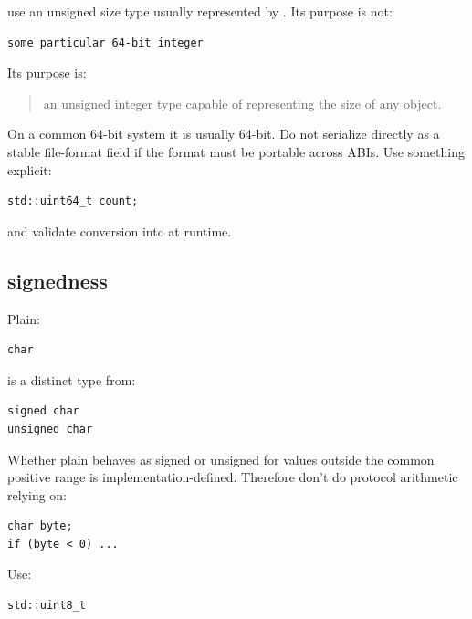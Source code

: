 use an unsigned size type usually represented by . Its purpose is not:

\begin{verbatim}
some particular 64-bit integer
\end{verbatim}

Its purpose is:

\begin{quote}
an unsigned integer type capable of representing the size of any object.
\end{quote}

On a common 64-bit system it is usually 64-bit. Do not serialize  directly as a stable file-format field if the format must be portable across ABIs. Use something explicit:

\begin{verbatim}
std::uint64_t count;
\end{verbatim}

and validate conversion into  at runtime.

\subsection{\texorpdfstring{ signedness}{char signedness}}\label{05-engine-i-ch002-char-signedness}

\hypertarget{05-engine-i-ch002-char-signedness}{}

Plain:

\begin{verbatim}
char
\end{verbatim}

is a distinct type from:

\begin{verbatim}
signed char
unsigned char
\end{verbatim}

Whether plain  behaves as signed or unsigned for values outside the common positive range is implementation-defined. Therefore don't do protocol arithmetic relying on:

\begin{verbatim}
char byte;
if (byte < 0) ...
\end{verbatim}

Use:

\begin{verbatim}
std::uint8_t
\end{verbatim}

